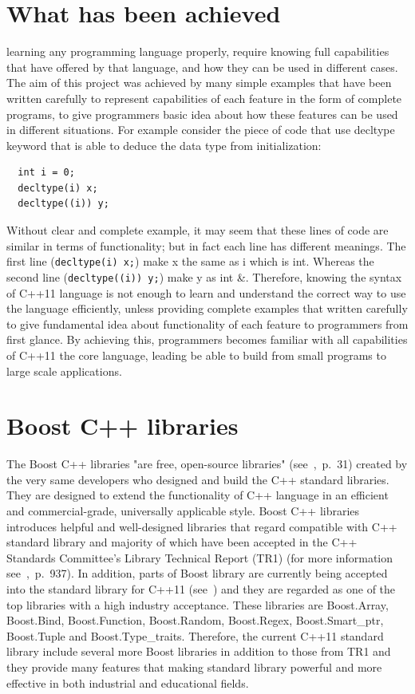 \documentclass[11pt]{report}
\begin{document}
\section{What has been achieved}
\label{what has been achieved}
learning any programming language properly, require knowing full capabilities that have offered by that language, and how they can be used in different cases. The aim of this project was achieved by many simple examples that have been written carefully to represent capabilities of each feature in the form of complete programs, to give programmers basic idea about how these features can be used in different situations. For example consider the piece of code that use decltype keyword that is able to deduce the data type from initialization:
\begin{lstlisting}
  int i = 0;
  decltype(i) x;
  decltype((i)) y;
\end{lstlisting}
Without clear and complete example, it may seem that these lines of code are similar in terms of functionality; but in fact each line has different meanings. The first line (\texttt{decltype(i) x;}) make x the same as i which is int. Whereas the second line (\texttt{decltype((i)) y;}) make y as int \&. Therefore, knowing the syntax of C++11 language is not enough to learn and understand the correct way to use the language efficiently, unless providing complete examples that written carefully to give fundamental idea about functionality of each feature to programmers from first glance. By achieving this, programmers becomes familiar with all capabilities of C++11 the core language, leading be able to build from small programs to large scale applications.

\section{Boost C++ libraries}
\label{sec: Boost}
The Boost C++ libraries "are free, open-source libraries" (see~\cite{Deitel:2012:CPP},~p.~31) created by the very same developers who designed and build the C++ standard libraries. They are designed to extend the functionality of C++ language in an efficient and commercial-grade, universally applicable style. Boost C++ libraries introduces helpful and well-designed libraries that regard compatible with C++ standard library and majority of which have been accepted in the C++ Standards Committee's Library Technical Report (TR1) (for more information see~\cite{Deitel:2012:CPP},~p.~937). In addition, parts of Boost library are currently being accepted into the standard library for C++11 (see~\cite{Boost:2007:Cpp}) and they are regarded as one of the top libraries with a high industry acceptance. These libraries are Boost.Array, Boost.Bind, Boost.Function, Boost.Random, Boost.Regex, Boost.Smart\_ptr, Boost.Tuple and Boost.Type\_traits. Therefore, the current C++11 standard library include several more Boost libraries in addition to those from TR1 and they provide many features that making standard library powerful and more effective in both industrial and educational fields.
\end{document}

